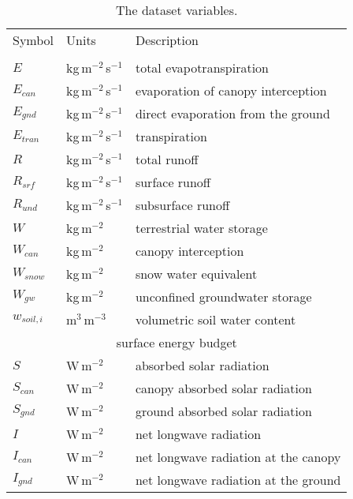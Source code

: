 \begin{table}[t]
  \caption{The dataset variables.}
  \label{tbl:variables}
  \centering
  \begin{tabular}{lll}
    \tophline
    Symbol         & Units                  & Description \\
    \middlehline
    \multicolumn{3}{c}{surface water budget}                                            \\
    \(E\)          & kg\,m$^{-2}$\,s$^{-1}$ & total evapotranspiration \\
    \(E_{can}\)    & kg\,m$^{-2}$\,s$^{-1}$ & evaporation of canopy interception \\
    \(E_{gnd}\)    & kg\,m$^{-2}$\,s$^{-1}$ & direct evaporation from the ground \\
    \(E_{tran}\)   & kg\,m$^{-2}$\,s$^{-1}$ & transpiration \\
    \(R\)          & kg\,m$^{-2}$\,s$^{-1}$ & total runoff \\
    \(R_{srf}\)    & kg\,m$^{-2}$\,s$^{-1}$ & surface runoff \\
    \(R_{und}\)    & kg\,m$^{-2}$\,s$^{-1}$ & subsurface runoff \\
    \(W\)          & kg\,m$^{-2}$           & terrestrial water storage \\
    \(W_{can}\)    & kg\,m$^{-2}$           & canopy interception \\
    \(W_{snow}\)   & kg\,m$^{-2}$           & snow water equivalent \\
    \(W_{gw}\)     & kg\,m$^{-2}$           & unconfined groundwater storage \\
    \(w_{soil,i}\) & m$^{3}$\,m$^{-3}$      & volumetric soil water content \\
    [1mm]
    \multicolumn{3}{c}{surface energy budget}                                           \\
    \(S\)          & W\,m$^{-2}$            & absorbed solar radiation \\
    \(S_{can}\)    & W\,m$^{-2}$            & canopy absorbed solar radiation \\
    \(S_{gnd}\)    & W\,m$^{-2}$            & ground absorbed solar radiation \\
    \(I\)          & W\,m$^{-2}$            & net longwave radiation \\
    \(I_{can}\)    & W\,m$^{-2}$            & net longwave radiation at the canopy \\
    \(I_{gnd}\)    & W\,m$^{-2}$            & net longwave radiation at the ground \\

\end{tabular}
\end{table}
